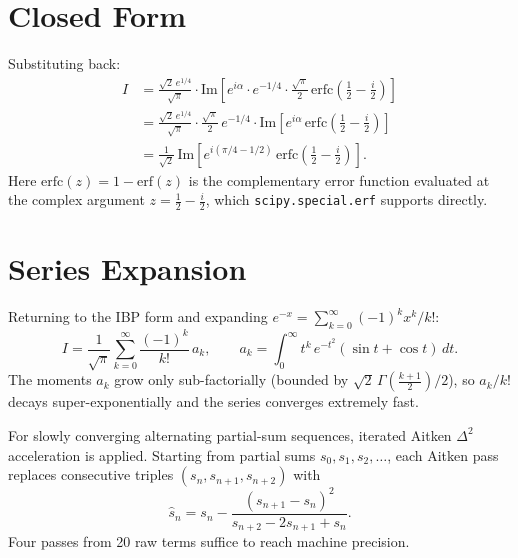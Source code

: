 \documentclass{article}
\begin{document}
\section{Closed Form}

Substituting back:
\begin{align*}
  I &= \frac{\sqrt{2}\,e^{1/4}}{\sqrt{\pi}}\cdot
       \mathrm{Im}\!\left[e^{i\alpha}\cdot e^{-1/4}\cdot\frac{\sqrt{\pi}}{2}
       \,\mathrm{erfc}\!\left(\tfrac{1}{2}-\tfrac{i}{2}\right)\right] \\[6pt]
    &= \frac{\sqrt{2}\,e^{1/4}}{\sqrt{\pi}}\cdot\frac{\sqrt{\pi}}{2}\,e^{-1/4}\cdot
       \mathrm{Im}\!\left[e^{i\alpha}\,\mathrm{erfc}\!\left(\tfrac{1}{2}-\tfrac{i}{2}\right)\right] \\[6pt]
    &= \frac{1}{\sqrt{2}}\,\mathrm{Im}\!\left[e^{i(\pi/4-1/2)}\,\mathrm{erfc}\!\left(\tfrac{1}{2}-\tfrac{i}{2}\right)\right].
\end{align*}
Here $\mathrm{erfc}(z) = 1 - \mathrm{erf}(z)$ is the complementary error function evaluated at the
complex argument $z = \tfrac{1}{2} - \tfrac{i}{2}$, which \texttt{scipy.special.erf} supports directly.

\section{Series Expansion}

Returning to the IBP form and expanding $e^{-x} = \sum_{k=0}^\infty (-1)^k x^k / k!$:
\[
  I = \frac{1}{\sqrt{\pi}}\sum_{k=0}^\infty \frac{(-1)^k}{k!}\,a_k,
  \qquad
  a_k = \int_0^\infty t^k\,e^{-t^2}(\sin t + \cos t)\,dt.
\]
The moments $a_k$ grow only sub-factorially (bounded by $\sqrt{2}\,\Gamma\!\left(\frac{k+1}{2}\right)/2$),
so $a_k/k!$ decays super-exponentially and the series converges extremely fast.

For slowly converging alternating partial-sum sequences, iterated Aitken $\Delta^2$ acceleration is applied.
Starting from partial sums $s_0, s_1, s_2, \ldots$, each Aitken pass replaces consecutive triples
$(s_n, s_{n+1}, s_{n+2})$ with
\[
  \hat{s}_n = s_n - \frac{(s_{n+1}-s_n)^2}{s_{n+2}-2s_{n+1}+s_n}.
\]
Four passes from 20 raw terms suffice to reach machine precision.
\end{document}
